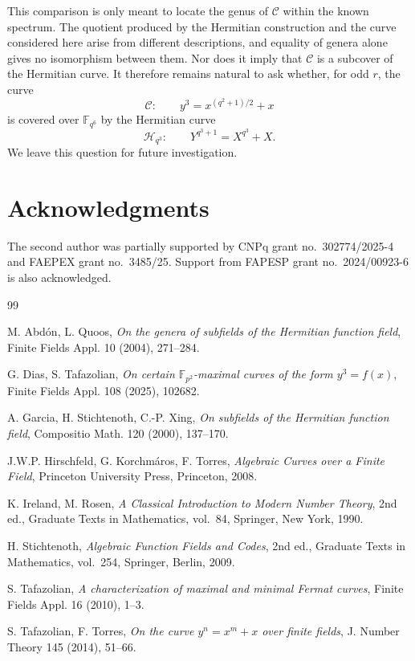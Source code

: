 \documentclass[3p,10pt]{elsarticle}
\theoremstyle{remark}
\newcommand{\cC}{\mathcal{C}}
\newcommand{\F}{\mathbb{F}}
\begin{document}
This comparison is only meant to locate the genus of $\cC$ within the known spectrum. The quotient produced by the Hermitian construction and the curve considered here arise from different descriptions, and equality of genera alone gives no isomorphism between them. Nor does it imply that $\cC$ is a subcover of the Hermitian curve. It therefore remains natural to ask whether, for odd $r$, the curve
\[
\cC:\qquad y^3=x^{(q^2+1)/2}+x
\]
is covered over $\F_{q^6}$ by the Hermitian curve
\[
\mathcal H_{q^3}:\qquad Y^{q^3+1}=X^{q^3}+X.
\]
We leave this question for future investigation.

\section*{Acknowledgments}

The second author was partially supported by CNPq grant no.~302774/2025-4 and FAEPEX grant no.~3485/25. Support from FAPESP grant no.~2024/00923-6 is also acknowledged.

\begin{thebibliography}{99}

M. Abd\'on, L. Quoos,
\emph{On the genera of subfields of the Hermitian function field},
Finite Fields Appl. 10 (2004), 271--284.

G. Dias, S. Tafazolian,
\emph{On certain $\F_{p^2}$-maximal curves of the form $y^3=f(x)$},
Finite Fields Appl. 108 (2025), 102682.

A. Garcia, H. Stichtenoth, C.-P. Xing,
\emph{On subfields of the Hermitian function field},
Compositio Math. 120 (2000), 137--170.

J.W.P. Hirschfeld, G. Korchm\'aros, F. Torres,
\emph{Algebraic Curves over a Finite Field},
Princeton University Press, Princeton, 2008.

K. Ireland, M. Rosen,
\emph{A Classical Introduction to Modern Number Theory},
2nd ed., Graduate Texts in Mathematics, vol.~84,
Springer, New York, 1990.

H. Stichtenoth,
\emph{Algebraic Function Fields and Codes},
2nd ed., Graduate Texts in Mathematics, vol.~254,
Springer, Berlin, 2009.

S. Tafazolian,
\emph{A characterization of maximal and minimal Fermat curves},
Finite Fields Appl. 16 (2010), 1--3.

S. Tafazolian, F. Torres,
\emph{On the curve $y^n=x^m+x$ over finite fields},
J. Number Theory 145 (2014), 51--66.

\end{thebibliography}
\end{document}
